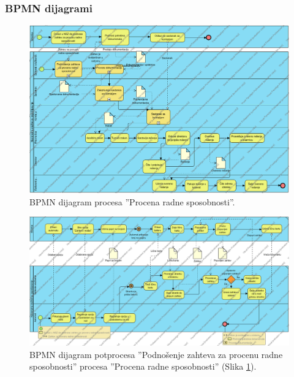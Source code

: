 \begin{mylandscape}
	\subsubsection{BPMN dijagrami}
	
	\begin{figure}[H]
		\centering
		\includegraphics[width=0.8\paperwidth]{dijagrami/bpmn-dijagrami/procena-radne-sposobnosti.png}
		\caption{BPMN dijagram procesa ''Procena radne sposobnosti''.}
		\label{bpmnd: procena radne sposobnosti}
	\end{figure}
	
	\newpage
	
	\begin{figure}[H]
		\centering
		\includegraphics[width=0.8\paperwidth]{dijagrami/bpmn-dijagrami/podnosenje-zahteva-za-procenu-radne-sposobnosti.png}
		\caption{BPMN dijagram potprocesa ''Podno\v senje zahteva za procenu radne sposobnosti'' procesa ''Procena radne sposobnosti'' (Slika \ref{bpmnd: procena radne sposobnosti}).}
	\end{figure}
	

\end{mylandscape}
